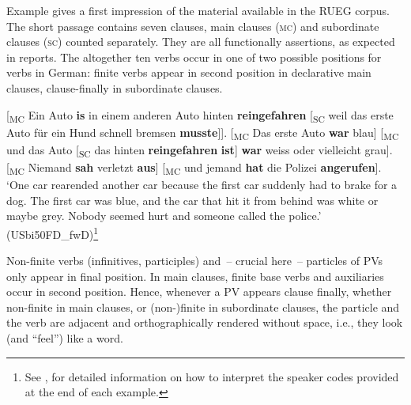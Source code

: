 \documentclass[output=paper,colorlinks,citecolor=brown]{langscibook}
\begin{document}
Example  gives a first impression of the material available in the RUEG corpus. The short passage contains seven clauses, main clauses (\textsc{mc}) and subordinate clauses (\textsc{sc}) counted separately. They are all functionally assertions, as expected in reports. The altogether ten verbs occur in one of two possible positions for verbs in German: finite verbs appear in second position in declarative main clauses, clause-finally in subordinate clauses.\largerpage

\begin{exe}
    \ex \label{ex:kelleretal:loc_fahren} {[}\textsubscript{MC} Ein Auto \textbf{is} in einem anderen Auto hinten \textbf{reingefahren} {[}\textsubscript{SC} weil das erste Auto für ein Hund schnell bremsen \textbf{musste}{]}{]}. {[}\textsubscript{MC} Das erste Auto \textbf{war} blau{]} {[}\textsubscript{MC} und das Auto {[}\textsubscript{SC} das hinten \textbf{reingefahren} \textbf{ist}{]} \textbf{war} weiss oder vielleicht grau{]}. {[}\textsubscript{MC} Niemand \textbf{sah} verletzt \textbf{aus}{]} {[}\textsubscript{MC} und jemand \textbf{hat} die Polizei \textbf{angerufen}{]}.\\
    `One car rearended another car because the first car suddenly had to brake for a dog. The first car was blue, and the car that hit it from behind was white or maybe grey. Nobody seemed hurt and someone called the police.' (USbi50FD\_fwD)\footnote{See ,  for detailed information on how to interpret the speaker codes provided at the end of each example.}
\end{exe}

Non-finite verbs (infinitives, participles) and~-- crucial here~-- particles of PVs only appear in final position. In main clauses, finite base verbs and auxiliaries occur in second position. Hence, whenever a PV appears clause finally, whether non-finite in main clauses, or (non-)finite in subordinate clauses, the particle and the verb are adjacent and orthographically rendered without space, i.e., they look (and ``feel'') like a word. 
\end{document}
